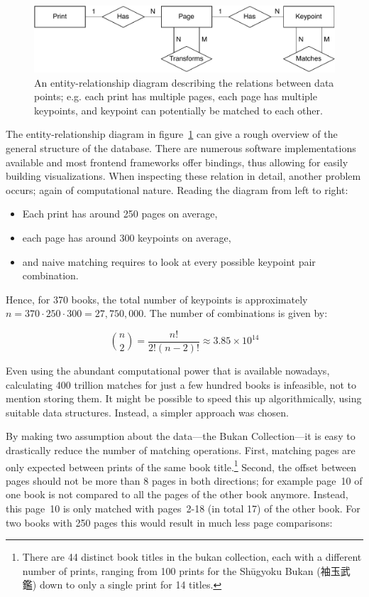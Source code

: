 \documentclass{ltjarticle}
\begin{document}
\begin{figure}
    \centering
    \includegraphics[width=\textwidth]{erschema.pdf}
    \caption[Entity-relationship diagram]{An entity-relationship diagram describing the relations between data points; e.g. each print has multiple pages, each page has multiple keypoints, and keypoint can potentially be matched to each other.}
    \label{fig:er-schema}
\end{figure}

The entity-relationship diagram in figure~\ref{fig:er-schema} can give a rough overview of the general structure of the database. There are numerous software implementations available and most frontend frameworks offer bindings, thus allowing for easily building visualizations. When inspecting these relation in detail, another problem occurs; again of computational nature. Reading the diagram from left to right:

\begin{itemize}
    \setlength\itemsep{0em}
    \item Each print has around 250 pages on average,
    \item each page has around 300 keypoints on average,
    \item and naive matching requires to look at every possible keypoint pair combination.
\end{itemize}

Hence, for 370 books, the total number of keypoints is approximately $n = 370 \cdot 250 \cdot 300 = 27,750,000$. The number of combinations is given by:

\begin{equation*}
    \binom{n}{2} = \frac{n!}{2!(n-2)!} \approx 3.85 \times 10^{14}
\end{equation*}

Even using the abundant computational power that is available nowadays, calculating 400 trillion matches for just a few hundred books is infeasible, not to mention storing them. It might be possible to speed this up algorithmically, using suitable data structures. Instead, a simpler approach was chosen.

By making two assumption about the data---the Bukan Collection---it is easy to drastically reduce the number of matching operations. First, matching pages are only expected between prints of the same book title.\footnote{There are 44 distinct book titles in the bukan collection, each with a different number of prints, ranging from 100 prints for the Shūgyoku Bukan (袖玉武鑑) down to only a single print for 14 titles.} Second, the offset between pages should not be more than 8 pages in both directions; for example page~10 of one book is not compared to all the pages of the other book anymore. Instead, this page~10 is only matched with pages~2-18 (in total 17) of the other book. For two books with 250 pages this would result in much less page comparisons:
\end{document}
